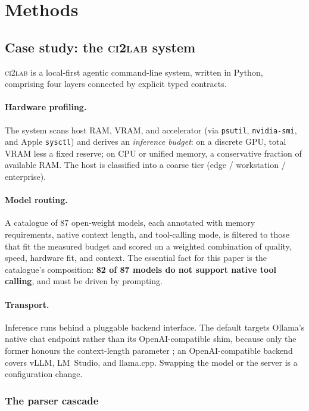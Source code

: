 \documentclass[11pt,a4paper]{article}
\begin{document}
\section{Methods}
\label{sec:methods}

\subsection{Case study: the \textsc{ci2lab} system}
\label{sec:system}

\textsc{ci2lab} is a local-first agentic command-line system, written in Python,
comprising four layers connected by explicit typed contracts.

\paragraph{Hardware profiling.} The system scans host RAM, VRAM, and accelerator
(via \texttt{psutil}, \texttt{nvidia-smi}, and Apple \texttt{sysctl}) and derives
an \emph{inference budget}: on a discrete GPU, total VRAM less a fixed reserve;
on CPU or unified memory, a conservative fraction of available RAM. The host is
classified into a coarse tier (edge / workstation / enterprise).

\paragraph{Model routing.} A catalogue of 87 open-weight models, each annotated
with memory requirements, native context length, and tool-calling mode, is
filtered to those that fit the measured budget and scored on a weighted
combination of quality, speed, hardware fit, and context. The essential fact for
this paper is the catalogue's composition: \textbf{82 of 87 models do not support
native tool calling}, and must be driven by prompting.

\paragraph{Transport.} Inference runs behind a pluggable backend interface. The
default targets Ollama's native chat endpoint rather than its
OpenAI-compatible shim, because only the former honours the context-length
parameter \citep{ollama}; an OpenAI-compatible backend covers vLLM, LM~Studio,
and llama.cpp. Swapping the model or the server is a configuration change.

\subsubsection{The parser cascade}
\label{sec:system-parsing}
\end{document}
